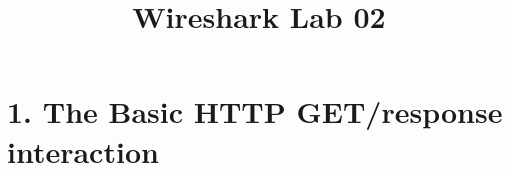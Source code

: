 \documentclass{article}
\title{Wireshark Lab 02}
\begin{document}

\section*{1. The Basic HTTP GET/response interaction}
\end{document}
